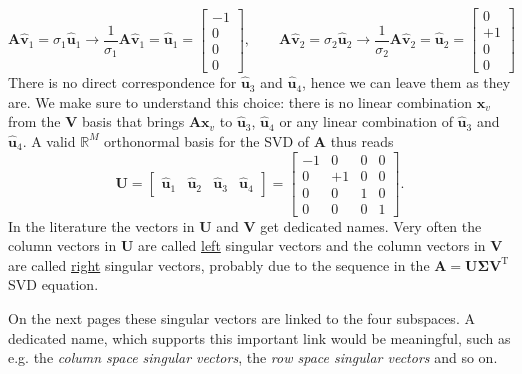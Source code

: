 \documentclass[a4paper, 11pt]{scrartcl}
\begin{document}
$$\bm{A} \hat{\bm{v}}_1 = \sigma_1 \hat{\bm{u}}_1
\rightarrow
\frac{1}{\sigma_1}\bm{A} \hat{\bm{v}}_1 = \hat{\bm{u}}_1 =
\begin{bmatrix}
-1\\0\\0\\0
\end{bmatrix},\qquad
\bm{A} \hat{\bm{v}}_2 = \sigma_2 \hat{\bm{u}}_2
\rightarrow
\frac{1}{\sigma_2}\bm{A} \hat{\bm{v}}_2 = \hat{\bm{u}}_2 =
\begin{bmatrix}
0\\+1\\0\\0
\end{bmatrix}
$$
There is no direct correspondence for $\hat{\bm{u}}_3$ and $\hat{\bm{u}}_4$, hence we can leave them as they are. We make sure to understand this choice: there is no linear combination $\bm{x}_v$ from the $\bm{V}$ basis that brings $\bm{A} \bm{x}_v$ to $\hat{\bm{u}}_{3}$, $\hat{\bm{u}}_{4}$ or any linear combination of $\hat{\bm{u}}_{3}$ and $\hat{\bm{u}}_{4}$.
A valid $\mathbb{R}^M$ orthonormal basis for the SVD of $\bm{A}$ thus reads
$$
\bm{U}
=
\begin{bmatrix}
\hat{\bm{u}}_1 & \hat{\bm{u}}_2 &\hat{\bm{u}}_3 & \hat{\bm{u}}_4
\end{bmatrix}
=
\begin{bmatrix}
-1 & 0 & 0 & 0\\
0 & +1 & 0 & 0\\
0 & 0 & 1 & 0\\
0 & 0 & 0 & 1
\end{bmatrix}.
$$
In the literature the vectors in $\bm{U}$ and $\bm{V}$ get dedicated names.
Very often the column vectors in $\bm{U}$ are called \underline{left} singular vectors and the column vectors in $\bm{V}$ are called \underline{right} singular vectors, probably due to the sequence in the $\bm{A} = \bm{U} \bm{\Sigma} \bm{V}^\mathrm{T}$ SVD equation.

On the next pages these singular vectors are linked to the four subspaces. A dedicated name, which supports this important link would be meaningful, such as e.g. the \textit{column space singular vectors}, the \textit{row space singular vectors} and so on.
\end{document}
